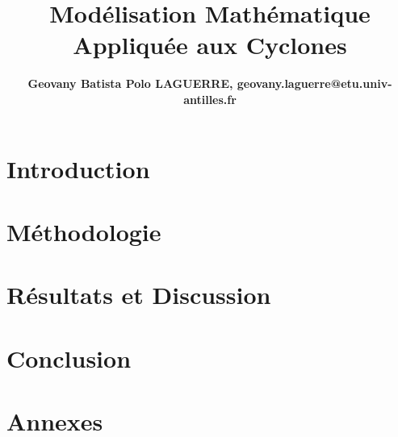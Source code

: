 \documentclass[a4paper,12pt]{book}
\title{Modélisation Mathématique Appliquée aux Cyclones}
\author{\textbf{Geovany Batista Polo LAGUERRE, geovany.laguerre@etu.univ-antilles.fr}}
\begin{document}
\maketitle



\tableofcontents

\chapter{Introduction}


\chapter{Méthodologie}


\chapter{Résultats et Discussion}


\chapter{Conclusion}


\appendix
\chapter{Annexes}

\end{document}
